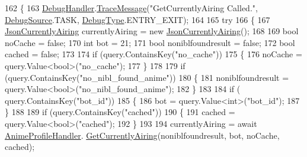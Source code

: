 \begin{DoxyCode}
162         \{
163             \mbox{\hyperlink{class_little_weeb_library_1_1_handlers_1_1_debug_handler}{DebugHandler}}.\mbox{\hyperlink{class_little_weeb_library_1_1_handlers_1_1_debug_handler_afccb37dfd6b2114af72000c2f4fe4607}{TraceMessage}}(\textcolor{stringliteral}{"GetCurrentlyAiring Called."}, 
      \mbox{\hyperlink{namespace_little_weeb_library_1_1_handlers_a2a6ca0775121c9c503d58aa254d292be}{DebugSource}}.TASK, \mbox{\hyperlink{namespace_little_weeb_library_1_1_handlers_ab66019ed40462876ec4e61bb3ccb0a62}{DebugType}}.ENTRY\_EXIT);
164 
165             \textcolor{keywordflow}{try}
166             \{
167                 \mbox{\hyperlink{class_little_weeb_library_1_1_models_1_1_json_currently_airing}{JsonCurrentlyAiring}} currentlyAiring = \textcolor{keyword}{new} 
      \mbox{\hyperlink{class_little_weeb_library_1_1_models_1_1_json_currently_airing}{JsonCurrentlyAiring}}();
168 
169                 \textcolor{keywordtype}{bool} noCache = \textcolor{keyword}{false};
170                 \textcolor{keywordtype}{int} bot = 21;
171                 \textcolor{keywordtype}{bool} noniblfoundresult = \textcolor{keyword}{false};
172                 \textcolor{keywordtype}{bool} cached = \textcolor{keyword}{false};
173 
174                 \textcolor{keywordflow}{if} (query.ContainsKey(\textcolor{stringliteral}{"no\_cache"}))
175                 \{
176                     noCache = query.Value<\textcolor{keywordtype}{bool}>(\textcolor{stringliteral}{"no\_cache"});
177                 \}
178 
179                 \textcolor{keywordflow}{if} (query.ContainsKey(\textcolor{stringliteral}{"no\_nibl\_found\_anime"}))
180                 \{
181                     noniblfoundresult = query.Value<\textcolor{keywordtype}{bool}>(\textcolor{stringliteral}{"no\_nibl\_found\_anime"});
182                 \}
183 
184                 \textcolor{keywordflow}{if} ( query.ContainsKey(\textcolor{stringliteral}{"bot\_id"}))
185                 \{
186                     bot = query.Value<\textcolor{keywordtype}{int}>(\textcolor{stringliteral}{"bot\_id"});
187                 \}
188 
189                 \textcolor{keywordflow}{if} (query.ContainsKey(\textcolor{stringliteral}{"cached"}))
190                 \{
191                     cached = query.Value<\textcolor{keywordtype}{bool}>(\textcolor{stringliteral}{"cached"});
192                 \}
193 
194                 currentlyAiring = await \mbox{\hyperlink{class_little_weeb_library_1_1_handlers_1_1_anime_profile_handler}{AnimeProfileHandler}}.
      \mbox{\hyperlink{class_little_weeb_library_1_1_handlers_1_1_anime_profile_handler_a7469a40799e1067d871ba87679f54c37}{GetCurrentlyAiring}}(noniblfoundresult, bot, noCache, cached);

\end{DoxyCode}
